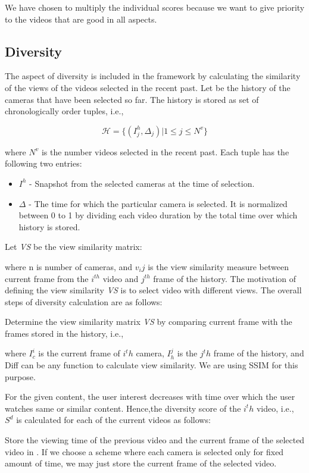 \documentclass{sig-alternate}
\begin{document}
We have chosen to multiply the individual scores because we
want to give priority to the videos that are good in all aspects.

\subsection{Diversity}

The aspect of diversity is included in the framework by calculating the similarity of the views of the videos selected in the recent past. Let  be the history of the cameras that have been selected so far. The history is stored as set of chronologically order tuples, i.e.,

\begin{equation}
    \mathcal{H} = \{(I_{j}^{h} , \Delta _j )|1 \leq j \leq N^v\}
\end{equation}

where $N^v$ is the number videos selected in the recent past. Each
tuple has the following two entries:

\begin{itemize}
    \item $I^h$ - Snapshot from the selected cameras at the time of selection.
    \item   $\Delta$ - The time for which the particular camera is selected. It is normalized between 0 to 1 by dividing each video duration by the total time over which history is stored.

    
\end{itemize}

Let \textit{VS} be the view similarity matrix:

where n is number of cameras, and $v_ij$ is the view similarity measure between current frame from the $i^{th}$ video and $j^{th}$ frame of the history. The motivation of defining the view similarity \textit{VS} is to select video with different views. The overall steps of diversity calculation are as follows:

\begin{enumerize}
    \item Determine the view similarity matrix \textit{VS} by comparing current frame with the frames stored in the history, i.e.,

    where $I_c^i$ is the current frame of $i^th$ camera, $I_h^j$ is the $j^th$ frame of the history, and Diff can be any function to calculate view similarity. We are using SSIM \cite{17} for this purpose.

    \item For the given content, the user interest decreases with time over which the user watches same or similar content. Hence,the diversity score of the $i^th$ video, i.e., $S^d$ is calculated for each of the current videos as follows:

    \item Store the viewing time of the previous video and the current frame of the selected video in . If we choose a scheme where each camera is selected only for fixed amount of time, we may just store the current frame of the selected video.

    

\end{enumerize}
\end{document}
